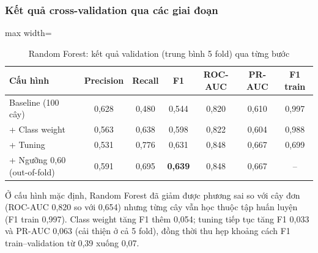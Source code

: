 \subsubsection{Kết quả cross-validation qua các giai đoạn}
\begin{table}[H]
\centering
\small
\begin{adjustbox}{max width=\textwidth}
\begin{tabular}{|l|c|c|c|c|c|c|}
\hline
\textbf{Cấu hình} & \textbf{Precision} & \textbf{Recall} & \textbf{F1} & \textbf{ROC-AUC} & \textbf{PR-AUC} & \textbf{F1 train} \\
\hline
Baseline (100 cây) & 0,628 & 0,480 & 0,544 & 0,820 & 0,610 & 0,997 \\
\hline
+ Class weight & 0,563 & 0,638 & 0,598 & 0,822 & 0,604 & 0,988 \\
\hline
+ Tuning & 0,531 & 0,776 & 0,631 & 0,848 & 0,667 & 0,699 \\
\hline
+ Ngưỡng 0,60 (out-of-fold) & 0,591 & 0,695 & \textbf{0,639} & 0,848 & 0,667 & -- \\
\hline
\end{tabular}
\end{adjustbox}
\caption{Random Forest: kết quả validation (trung bình 5 fold) qua từng bước}
\end{table}

Ở cấu hình mặc định, Random Forest đã giảm được phương sai so với cây đơn (ROC-AUC 0,820 so với 0,654) nhưng từng cây vẫn học thuộc tập huấn luyện (F1 train 0,997). Class weight tăng F1 thêm 0,054; tuning tiếp tục tăng F1 0,033 và PR-AUC 0,063 (cải thiện ở cả 5 fold), đồng thời thu hẹp khoảng cách F1 train--validation từ 0,39 xuống 0,07.

